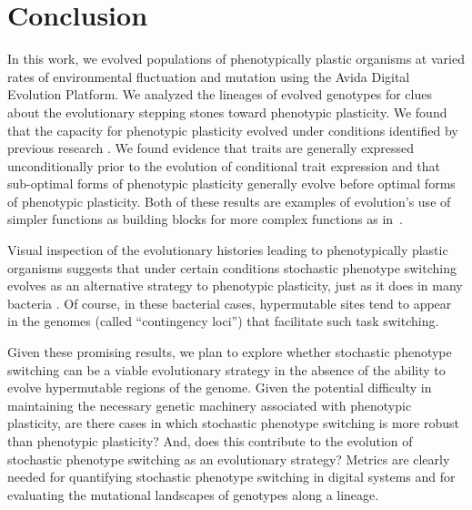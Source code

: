 \section{Conclusion}

In this work, we evolved populations of phenotypically plastic organisms at varied rates of environmental fluctuation and mutation using the Avida Digital Evolution Platform. 
We analyzed the lineages of evolved genotypes for clues about the evolutionary stepping stones toward phenotypic plasticity. 
We found that the capacity for phenotypic plasticity evolved under conditions identified by previous research \citep{clune_investigating_2007,ghalambor_behavior_2010}. 
We found evidence that traits are generally expressed unconditionally prior to the evolution of conditional trait expression and that sub-optimal forms of phenotypic plasticity generally evolve before optimal forms of phenotypic plasticity. 
Both of these results are examples of evolution's use of simpler functions as building blocks for more complex functions as in~\cite{lenski_evolutionary_2003}. 

Visual inspection of the evolutionary histories leading to phenotypically plastic organisms suggests that under certain conditions stochastic phenotype switching evolves as an alternative strategy to phenotypic plasticity, just as it does in many bacteria \citep{moxon_bacterial_2006,rainey_evolutionary_2011}.  
Of course, in these bacterial cases, hypermutable sites tend to appear in the genomes (called ``contingency loci'') that facilitate such task switching.

Given these promising results, we plan to explore whether stochastic phenotype switching can be a viable evolutionary strategy in the absence of the ability to evolve hypermutable regions of the genome. 
Given the potential difficulty in maintaining the necessary genetic machinery associated with phenotypic plasticity, are there cases in which stochastic phenotype switching is more robust than phenotypic plasticity? 
And, does this contribute to the evolution of stochastic phenotype switching as an evolutionary strategy? 
Metrics are clearly needed for quantifying stochastic phenotype switching in digital systems and for evaluating the mutational landscapes of genotypes along a lineage. 